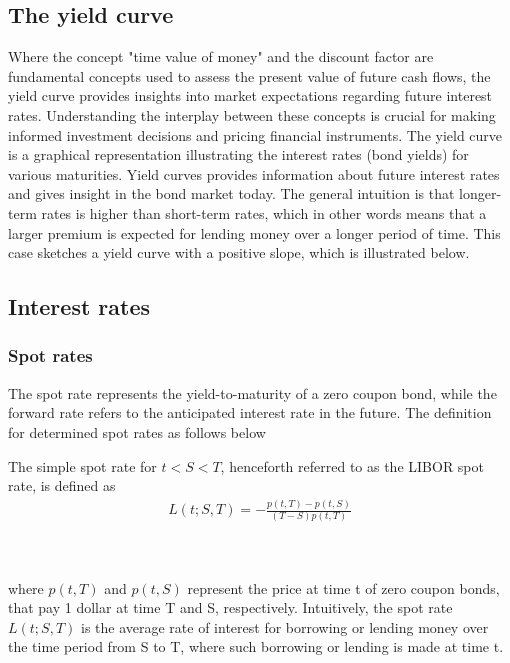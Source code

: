 \subsection{The yield curve}
Where the concept "time value of money" and the discount factor are fundamental concepts used to assess the present value of future
cash flows, the yield curve provides insights into market expectations regarding future interest rates.
Understanding the interplay between these concepts is crucial for making informed investment decisions and pricing
financial instruments. The yield curve is a graphical representation illustrating the interest rates (bond yields) for various maturities.
Yield curves provides information about future interest rates and gives insight in the bond market today. 
The general intuition is that longer-term rates is higher than short-term rates, which in other words means that a
larger premium is expected for lending money over a longer period of time. This case sketches a yield curve with a 
positive slope, which is illustrated below.
\begin{center}
\end{center}
\subsection{Interest rates}
\subsubsection{Spot rates}
The spot rate represents the yield-to-maturity of a zero coupon bond,
while the forward rate refers to the anticipated interest rate in the 
future. The definition for determined spot rates as follows 
below
\begin{definition}\label{def:spot}
    The simple spot rate for $t<S<T$, henceforth referred to as the 
    LIBOR spot rate, is defined as \cite{Bjork} 
    \begin{align*}
        L(t;S,T) = - \frac{p(t,T)-p(t,S)}{(T-S)p(t,T)}
    \end{align*}
\end{definition} 
\noindent
\\\\
where $p(t,T)$ and $p(t,S)$ represent the price at time t of zero coupon bonds, that pay
1 dollar at time T and S, respectively. Intuitively, the spot rate $L(t;S,T)$ is the 
average rate of interest for borrowing or lending money over the time period from S to T, 
where such borrowing or lending is made at time t. 
